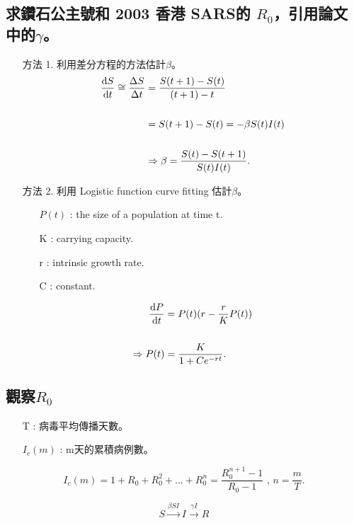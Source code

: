 \documentclass[12pt,a4paper]{article}
\begin{document}
\subsection{求鑽石公主號和 2003 香港 SARS的 $R_{0}$，引用論文中的$\gamma$。}
\qquad	
 \begin{itemize}
 \item[方法 1.]
利用差分方程的方法估計$\beta$。
\qquad
    \begin{align*}
\odv{S}{t}\cong \frac{\Delta S}{\Delta t}&=\frac{S(t+1)-S(t)}{(t+1)-t}\\
\quad\\
                                         &=S(t+1)-S(t)=-\beta S(t)I(t)\\
\quad\\
                        &\Rightarrow\beta=\frac{S(t)-S(t+1)}{S(t)I(t)}.\\
     \end{align*}
   
 \item[方法 2.]
利用 Logistic function curve fitting 估計$\beta$。
\qquad
\begin{itemize}
  \item[$P(t)$]: the size of a population at time t.
  \item[K]: carrying capacity.
  \item[r]: intrinsic growth rate.
  \item[C]: constant.
\end{itemize}
\begin{align*}
\odv{P}{t}&=P(t)(r-\frac{r}{K}P(t))\\
\quad\\
\Rightarrow P(t)&=\frac{K}{1+Ce^{-rt}}.\\
\end{align*}

\end{itemize}



\subsection{觀察$R_{0}$}
\begin{itemize}
\item[T]: 病毒平均傳播天數。
\item[$I_{c}(m)$]: m天的累積病例數。
\end{itemize}

$$I_{c}(m)=1+R_{0}+R_{0}^2+...+R_{0}^n=\frac{R_{0}^{n+1}-1}{R_{0}-1}\mbox{ , }n=\frac{m}{T}.$$





\newpage

$$S\xrightarrow{{\beta SI}}I\xrightarrow{{\gamma I}}R$$
\end{document}
